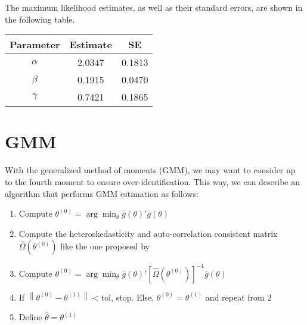\documentclass[cm,linguex]{glossa}
\providecommand{\tightlist}{%
  \setlength{\itemsep}{0pt}\setlength{\parskip}{0pt}}
\begin{document}
The maximum likelihood estimates, as well as their standard errors, are
shown in the following table.

\begin{longtable}[]{@{}ccc@{}}
\toprule()
Parameter & Estimate & SE \\
\midrule()
\endhead
\(\alpha\) & 2.0347 & 0.1813 \\
\(\beta\) & 0.1915 & 0.0470 \\
\(\gamma\) & 0.7421 & 0.1865 \\
\bottomrule()
\end{longtable}

\hypertarget{gmm}{%
\section{GMM}\label{gmm}}

With the generalized method of moments (GMM), we may want to consider up
to the fourth moment to ensure over-identification. This way, we can
describe an algorithm that performs GMM estimation as follows:

\begin{enumerate}
\def\labelenumi{\arabic{enumi}.}
\tightlist
\item
  Compute
  \(\theta^{(0)} = \arg\min_\theta \bar{g}(\theta)'\bar{g}(\theta)\)
\item
  Compute the heteroskedasticity and auto-correlation consistent matrix
  \(\hat{\Omega} \left(\theta^{(0)}\right)\) like the one proposed by
  \citet{HAC}
\item
  Compute
  \(\theta^{(0)} = \arg\min_\theta \bar{g}(\theta)'\left[\hat{\Omega} \left(\theta^{(0)}\right)\right]^{-1}\bar{g}(\theta)\)
\item
  If
  \(\left\lVert \theta^{(0)} - \theta^{(1)} \right\rVert < \text{tol}\),
  stop. Else, \(\theta^{(0)} = \theta^{(1)}\) and repeat from 2
\item
  Define \(\hat{\theta} = \theta^{(1)}\)
\end{enumerate}


\end{document}
